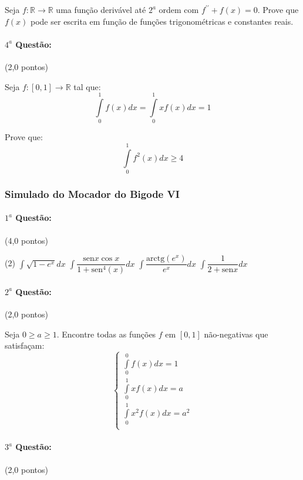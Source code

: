 \documentclass[12pt,a4paper]{article}
\newcommand{\sen}{\mathrm{sen}}
\begin{document}
Seja $f:\mathbb{R} \rightarrow \mathbb{R}$ uma função derivável até $2^a$ ordem com $f^{\prime \prime} + f(x)=0$. Prove que $f(x)$ pode ser
escrita em função de funções trigonométricas e constantes reais.

\paragraph{$4^a$ Questão:} (2,0 pontos)

Seja $f:[0,1]\rightarrow \mathbb{R}$ tal que:
$$\displaystyle\int\limits_0^1 f(x)dx=\displaystyle\int\limits_0^1xf(x)dx=1$$

Prove que:
$$\displaystyle\int\limits_0^1 f^2(x)dx \geq 4$$

\newpage

\subsubsection{Simulado do Mocador do Bigode VI}

\paragraph{$1^a$ Questão:} (4,0 pontos)

\begin{tasks}(2)
\task $\displaystyle\int \sqrt{1-e^{x}} dx$ 
\task $\displaystyle\int \dfrac{\sen{x} \cos{x}}{1+\textrm{sen}^4(x)}dx$ 
\task $\displaystyle\int \dfrac{\textrm{arctg}(e^x)}{e^x} dx$
\task $\displaystyle\int \dfrac{1}{2+\sen{x}} dx$
\end{tasks}

\paragraph{$2^a$ Questão:} (2,0 pontos)

Seja $0 \geq a \geq 1$. Encontre todas as funções $f$ em $[0,1]$ não-negativas que satisfaçam:
$$
\begin{cases}
\displaystyle\int\limits_0^0 f(x)dx = 1 \\
\displaystyle\int\limits_0^1 xf(x)dx = a \\
\displaystyle\int\limits_0^1 x^2f(x)dx = a^2 \\
\end{cases}
$$

\paragraph{$3^a$ Questão:} (2,0 pontos)
\end{document}
